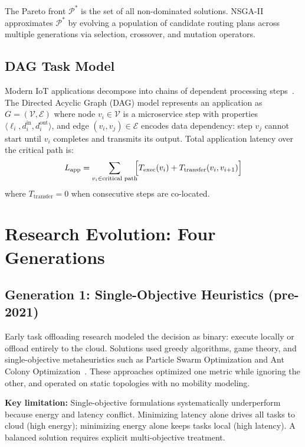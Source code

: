 \documentclass[12pt,a4paper]{article}
\begin{document}
The Pareto front $\mathcal{P}^*$ is the set of all non-dominated solutions.
NSGA-II~\cite{jafari2021} approximates $\mathcal{P}^*$ by evolving a population
of candidate routing plans across multiple generations via selection, crossover,
and mutation operators.

\subsection{DAG Task Model}

Modern IoT applications decompose into chains of dependent processing
steps~\cite{li2025microservice}. The Directed Acyclic Graph (DAG) model
represents an application as $G = (\mathcal{V}, \mathcal{E})$ where node
$v_i \in \mathcal{V}$ is a microservice step with properties
$\langle \ell_i, d_i^{\text{in}}, d_i^{\text{out}} \rangle$,
and edge $(v_i, v_j) \in \mathcal{E}$ encodes data dependency: step $v_j$
cannot start until $v_i$ completes and transmits its output. Total application
latency over the critical path is:
\begin{equation}
  L_{\text{app}} = \sum_{v_i \in \text{critical path}}
  \!\!\Bigl[ T_{\text{exec}}(v_i) + T_{\text{transfer}}(v_i, v_{i+1}) \Bigr]
  \label{eq:dag_latency}
\end{equation}
where $T_{\text{transfer}} = 0$ when consecutive steps are co-located.

\section{Research Evolution: Four Generations}
\label{sec:evolution}

\subsection{Generation 1: Single-Objective Heuristics (pre-2021)}

Early task offloading research modeled the decision as binary: execute locally
or offload entirely to the cloud. Solutions used greedy algorithms, game theory,
and single-objective metaheuristics such as Particle Swarm Optimization and Ant
Colony Optimization~\cite{jafari2021}. These approaches optimized one metric while
ignoring the other, and operated on static topologies with no mobility modeling.

\textbf{Key limitation:} Single-objective formulations systematically underperform
because energy and latency conflict. Minimizing latency alone drives all tasks to
cloud (high energy); minimizing energy alone keeps tasks local (high latency). A
balanced solution requires explicit multi-objective treatment.
\end{document}
